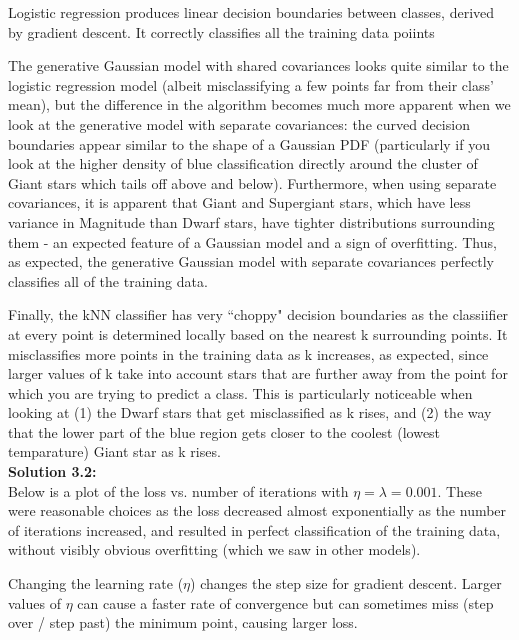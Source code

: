\documentclass[submit]{harvardml}
\begin{document}
Logistic regression produces linear decision boundaries between classes, derived by gradient descent. It correctly classifies all the training data poiints

The generative Gaussian model with shared covariances looks quite similar to the logistic regression model (albeit misclassifying a few points far from their class' mean), but the difference in the algorithm becomes much more apparent when we look at the generative model with separate covariances: the curved decision boundaries appear similar to the shape of a Gaussian PDF (particularly if you look at the higher density of blue classification directly around the cluster of Giant stars which tails off above and below). Furthermore, when using separate covariances, it is apparent that Giant and Supergiant stars, which have less variance in Magnitude than Dwarf stars, have tighter distributions surrounding them - an expected feature of a Gaussian model and a sign of overfitting. Thus, as expected, the generative Gaussian model with separate covariances perfectly classifies all of the training data. 

Finally, the kNN classifier has very ``choppy" decision boundaries as the classiifier at every point is determined locally based on the nearest k surrounding points. It misclassifies more points in the training data as k increases, as expected, since larger values of k take into account stars that are further away from the point for which you are trying to predict a class. This is particularly noticeable when looking at (1) the Dwarf stars that get misclassified as k rises, and (2) the way that the lower part of the blue region gets closer to the coolest (lowest temparature) Giant star as k rises.\\

\noindent\textbf{Solution 3.2:}\\
Below is a plot of the loss vs. number of iterations with $\eta = \lambda = 0.001$. These were reasonable choices as the loss decreased almost exponentially as the number of iterations increased, and resulted in perfect classification of the training data, without visibly obvious overfitting (which we saw in other models).

Changing the learning rate ($\eta$) changes the step size for gradient descent. Larger values of $\eta$ can cause a faster rate of convergence but can sometimes miss (step over / step past) the minimum point, causing larger loss.
\end{document}
